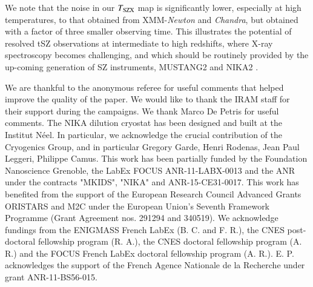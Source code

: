 \documentclass[twocolumn,traditabstract]{aa}
\newcommand{\ccor}[1]{\textcolor{Mypink}{#1}}
\def\TSZ {T_{\rm SZX}}
\begin{document}
We note that the noise in our $\TSZ$ map is \ccor{significantly lower, especially at high temperatures,} to that obtained from XMM-\textit{Newton} and \textit{Chandra}, but obtained with a factor of three smaller observing time. This illustrates the potential of resolved tSZ observations at intermediate to high redshifts, where X-ray spectroscopy becomes challenging, and which should be routinely provided by the up-coming generation of SZ instruments, MUSTANG2 \citep{Dicker2014} and NIKA2 \citep{Calvo2016,Comis2016}.

\begin{acknowledgements}
\ccor{We are thankful to the anonymous referee for useful comments that helped improve the quality of the paper.}
We would like to thank the IRAM staff for their support during the campaigns. 
We thank Marco De Petris for useful comments.
The NIKA dilution cryostat has been designed and built at the Institut N\'eel. In particular, we acknowledge the crucial contribution of the Cryogenics Group, and in particular Gregory Garde, Henri Rodenas, Jean Paul Leggeri, Philippe Camus. 
This work has been partially funded by the Foundation Nanoscience Grenoble, the LabEx FOCUS ANR-11-LABX-0013 and the ANR under the contracts "MKIDS", "NIKA" and ANR-15-CE31-0017. 
This work has benefited from the support of the European Research Council Advanced Grants ORISTARS and M2C under the European Union's Seventh Framework Programme (Grant Agreement nos. 291294 and 340519).
We acknowledge fundings from the ENIGMASS French LabEx (B. C. and F. R.), the CNES post-doctoral fellowship program (R. A.), the CNES doctoral fellowship program (A. R.) and the FOCUS French LabEx doctoral fellowship program (A. R.).
E. P. acknowledges the support of the French Agence Nationale de la Recherche under grant ANR-11-BS56-015.
\end{acknowledgements}



\appendix
\end{document}
